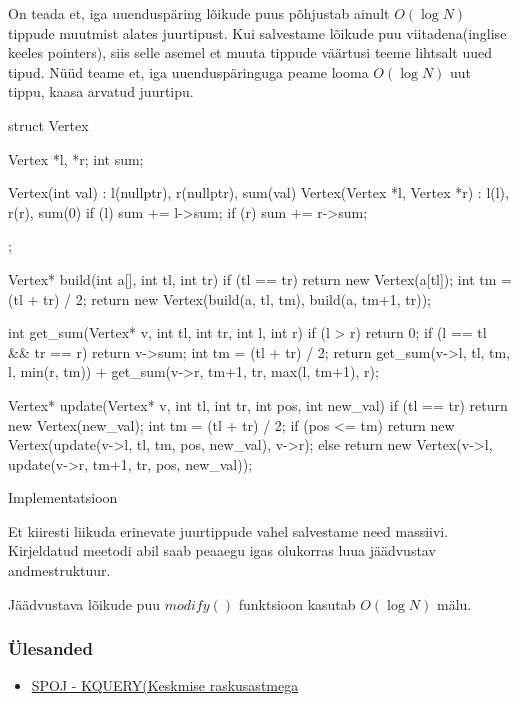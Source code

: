 \documentclass{trkut}
\begin{document}
On teada et, iga uuenduspäring lõikude puus põhjustab ainult $O(\log N)$ tippude muutmist alates juurtipust. 
Kui salvestame lõikude puu viitadena(inglise keeles pointers), siis selle asemel et muuta tippude väärtusi teeme lihtsalt uued tipud. Nüüd teame et, iga uuenduspäringuga peame looma $O(\log N)$ uut tippu, kaasa arvatud juurtipu.
\parencite{EMaxx}
\begin{cclol}
struct Vertex {
    Vertex *l, *r;
    int sum;

    Vertex(int val) : l(nullptr), r(nullptr), sum(val) {}
    Vertex(Vertex *l, Vertex *r) : l(l), r(r), sum(0) {
        if (l) sum += l->sum;
        if (r) sum += r->sum;
    }
};

Vertex* build(int a[], int tl, int tr) {
    if (tl == tr)
        return new Vertex(a[tl]);
    int tm = (tl + tr) / 2;
    return new Vertex(build(a, tl, tm), build(a, tm+1, tr));
}

int get_sum(Vertex* v, int tl, int tr, int l, int r) {
    if (l > r)
        return 0;
    if (l == tl && tr == r)
        return v->sum;
    int tm = (tl + tr) / 2;
    return get_sum(v->l, tl, tm, l, min(r, tm))
         + get_sum(v->r, tm+1, tr, max(l, tm+1), r);
}

Vertex* update(Vertex* v, int tl, int tr, int pos, int new_val) {
    if (tl == tr)
        return new Vertex(new_val);
    int tm = (tl + tr) / 2;
    if (pos <= tm)
        return new Vertex(update(v->l, tl, tm, pos, new_val), v->r);
    else
        return new Vertex(v->l, update(v->r, tm+1, tr, pos, new_val));
}
\end{cclol}
 \begin{kk}[H]%
    \caption{Implementatsioon}%
    \label{EMaxx}%
    \end{kk}
Et kiiresti liikuda erinevate juurtippude vahel salvestame need massiivi.
Kirjeldatud meetodi abil saab peaaegu igas olukorras luua jäädvustav andmestruktuur. 

Jäädvustava lõikude puu $modify()$ funktsioon kasutab $O(\log N)$ mälu.

\subsubsection{Ülesanded}
\begin{itemize}
    \item \href{https://www.spoj.com/problems/KQUERY/}{SPOJ - KQUERY(Keskmise raskusastmega}
\end{itemize}
\end{document}
